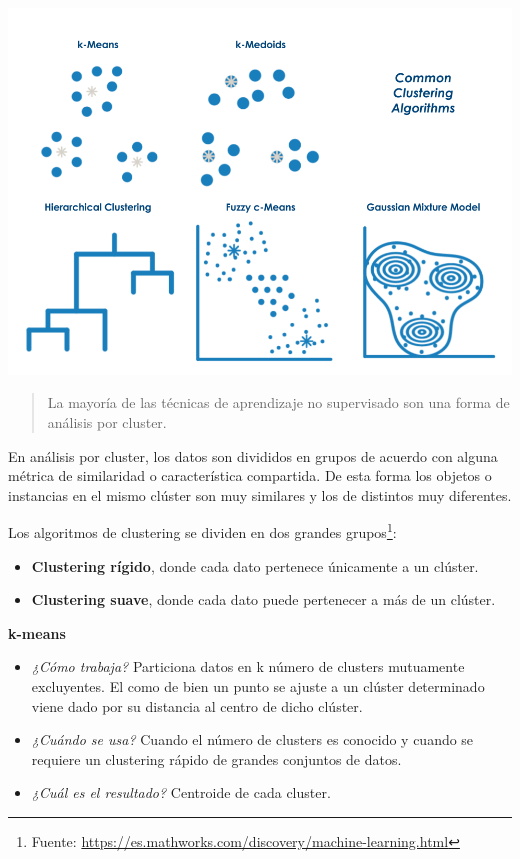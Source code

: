 \documentclass[]{book}
\let\rmarkdownfootnote\footnote%
\def\footnote{\protect\rmarkdownfootnote}
\begin{document}
\includegraphics[width=0.8\linewidth]{imgs/unsupervisedtechniques}

\begin{quote}
La mayoría de las técnicas de aprendizaje no supervisado son una forma de análisis por cluster.
\end{quote}

En análisis por cluster, los datos son divididos en grupos de acuerdo con alguna métrica de similaridad o característica compartida. De esta forma los objetos o instancias en el mismo clúster son muy similares y los de distintos muy diferentes.

Los algoritmos de clustering se dividen en dos grandes grupos\footnote{Fuente: \url{https://es.mathworks.com/discovery/machine-learning.html}}:

\begin{itemize}
\item
  \textbf{Clustering rígido}, donde cada dato pertenece únicamente a un clúster.
\item
  \textbf{Clustering suave}, donde cada dato puede pertenecer a más de un clúster.
\end{itemize}

\textbf{k-means}

\begin{itemize}
\item
  \emph{¿Cómo trabaja?} Particiona datos en k número de clusters mutuamente excluyentes. El como de bien un punto se ajuste a un clúster determinado viene dado por su distancia al centro de dicho clúster.
\item
  \emph{¿Cuándo se usa?} Cuando el número de clusters es conocido y cuando se requiere un clustering rápido de grandes conjuntos de datos.
\item
  \emph{¿Cuál es el resultado?} Centroide de cada cluster.
\end{itemize}
\end{document}
